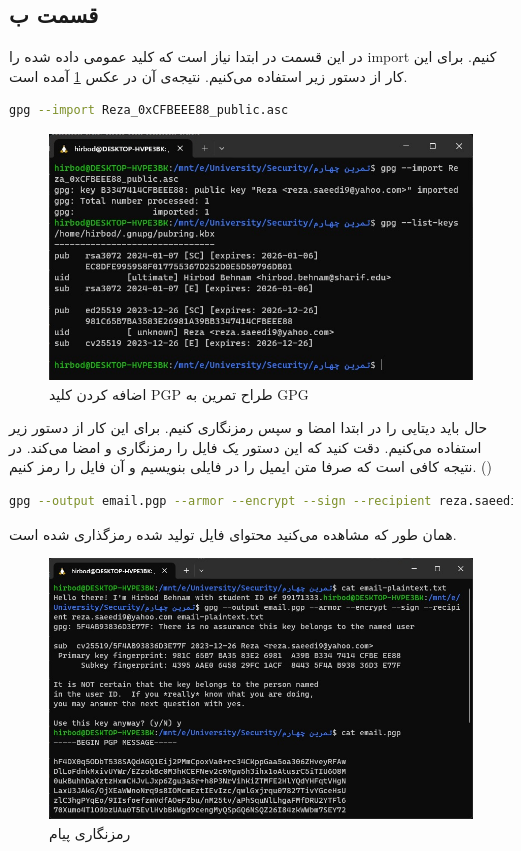 \documentclass[]{article}
\begin{document}
\subsection*{قسمت ب}
در این قسمت در ابتدا نیاز است که کلید عمومی داده شده را
import
کنیم. برای این کار از دستور زیر استفاده می‌کنیم. نتیجه‌ی آن در عکس
\ref{fig:gpg:import}
آمده است.
\begin{latin}
\begin{lstlisting}[language=sh]
gpg --import Reza_0xCFBEEE88_public.asc
\end{lstlisting}
\end{latin}
\begin{figure}[H]
    \centering
    \includegraphics[scale=0.5]{pics/gpg-import.jpg}
    \caption{اضافه کردن کلید PGP طراح تمرین به GPG}
    \label{fig:gpg:import}
\end{figure}
حال باید دیتایی را در ابتدا امضا و سپس رمزنگاری کنیم. برای این کار از دستور زیر استفاده می‌کنیم.
دقت کنید که این دستور یک فایل را رمزنگاری و امضا می‌کند. در نتیجه کافی است که صرفا متن ایمیل را در فایلی
بنویسیم و آن فایل را رمز کنیم.
()
\begin{latin}
\begin{lstlisting}[language=sh]
gpg --output email.pgp --armor --encrypt --sign --recipient reza.saeedi9@yahoo.com email-plaintext.txt
\end{lstlisting}
\end{latin}
همان طور که مشاهده می‌کنید محتوای فایل تولید شده رمزگذاری شده است.
\begin{figure}[H]
    \centering
    \includegraphics[scale=0.5]{pics/gpg-encrypt.jpg}
    \caption{رمزنگاری پیام}
    \label{fig:gpg:encrypt}
\end{figure}
\end{document}
